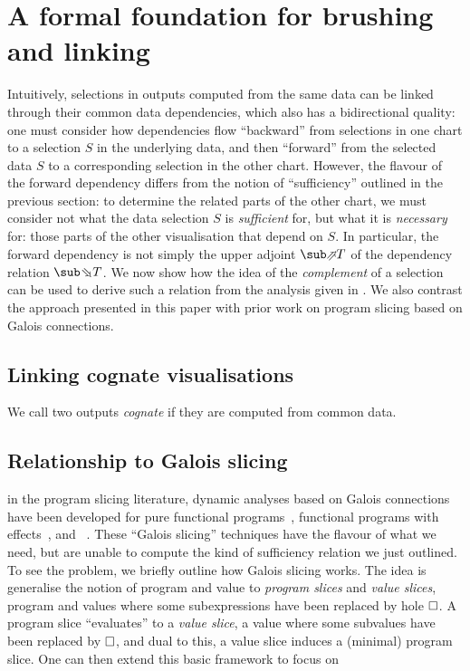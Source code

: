 \section{A formal foundation for brushing and linking}
\label{sec:toolkit}

Intuitively, selections in outputs computed from the same data can be linked through their common data dependencies, which also has a bidirectional quality: one must consider how dependencies flow ``backward'' from selections in one chart to a selection $S$ in the underlying data, and then ``forward'' from the selected data $S$ to a corresponding selection in the other chart. However, the flavour of the forward dependency differs from the notion of ``sufficiency'' outlined in the previous section: to determine the related parts of the other chart, we must consider not what the data selection $S$ is \emph{sufficient} for, but what it is \emph{necessary} for: those parts of the other visualisation that depend on $S$. In particular, the forward dependency is not simply the upper adjoint $\evalFwdF{T}$ of the dependency relation $\evalBwdF{T}$. We now show how the idea of the \emph{complement} of a selection can be used to derive such a relation from the analysis given in . We also contrast the approach presented in this paper with prior work on program slicing based on Galois connections.



\subsection{Linking cognate visualisations}

We call two outputs \emph{cognate} if they are computed from common data.


\subsection{Relationship to Galois slicing}

in the program slicing literature, dynamic analyses based on Galois connections have been developed for pure functional programs~\cite{perera12a}, functional programs with effects~\cite{ricciotti17}, and \piCalculus~\cite{perera16d}. These ``Galois slicing'' techniques have the flavour of what we need, but are unable to compute the kind of sufficiency relation we just outlined. To see the problem, we briefly outline how Galois slicing works. The idea is generalise the notion of program and value to \emph{program slices} and \emph{value slices}, program and values where some subexpressions have been replaced by hole $\square$. A program slice ``evaluates'' to a \emph{value slice}, a value where some subvalues have been replaced by $\square$, and dual to this, a value slice induces a (minimal) program slice. One can then extend this basic framework to focus on

